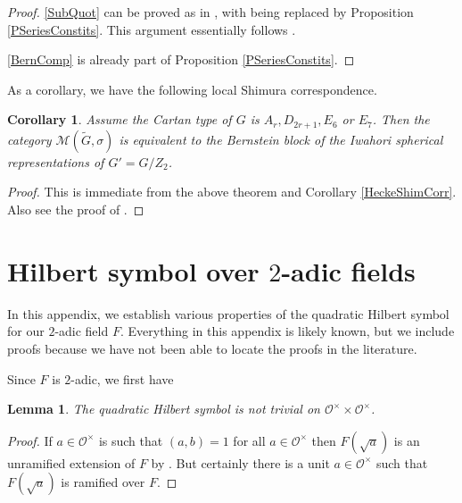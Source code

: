 \documentclass[10pt, letterpaper]{amsart}
\theoremstyle{plain}
\newtheorem{Cor}[equation]{Corollary}
\newtheorem{Lem}[equation]{Lemma}
\theoremstyle{definition}
\numberwithin{equation}{section}
\newcommand{\Gt}{\widetilde{G}}
\newcommand{\Ocal}{\mathcal{O}}
\begin{document}
\begin{proof} 
\eqref{SubQuot} can be proved as in \cite[Theorem 7.1]{Karasiewicz}, with \cite[Proposition 7.4]{Karasiewicz} being replaced by Proposition \ref{PSeriesConstits}. This argument essentially follows \cite[(8.3) Theorem]{BK98}.

\eqref{BernComp} is already part of Proposition \ref{PSeriesConstits}.
\end{proof}

As a corollary, we have the following local Shimura correspondence.

\begin{Cor}\label{C:local_Shimura_Correspondence}
    Assume the Cartan type of $G$ is $A_r, D_{2r+1}, E_6$ or $E_7$. Then the category $\mathcal{M}(\Gt,\sigma)$ is equivalent to the Bernstein block of the Iwahori spherical representations of $G'=G\slash Z_2$.
\end{Cor}
\begin{proof}
    This is immediate from the above theorem and Corollary \ref{HeckeShimCorr}. Also see the proof of \cite[Theorem 8.1]{Karasiewicz}.
\end{proof}




\appendix


\section{Hilbert symbol over $2$-adic fields}\label{S:Appendix_Hilbert_symbol}


In this appendix, we establish various properties of the quadratic Hilbert symbol for our $2$-adic field $F$. Everything in this appendix is likely known, but we include proofs because we have not been able to locate the proofs in the literature.

Since $F$ is $2$-adic, we first have
\begin{Lem}
The quadratic Hilbert symbol is not trivial on $\Ocal^\times\times\Ocal^\times$.
\end{Lem}
\begin{proof}
If $a\in\Ocal^\times$ is such that $(a, b)=1$ for all $a\in\Ocal^\times$ then $F(\sqrt{a})$ is an unramified extension of $F$ by \cite[Exercise 5, p.209]{Serre}. But certainly there is a unit $a\in\Ocal^\times$ such that $F(\sqrt{a})$ is ramified over $F$. 
\end{proof}
\end{document}
